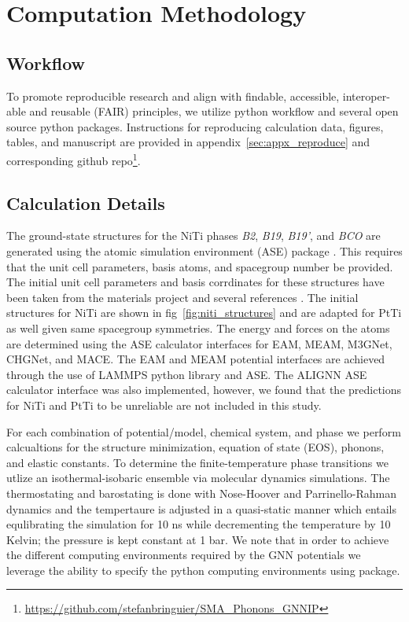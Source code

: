 \documentclass[preprint]{elsarticle}
\begin{document}
\section{Computation Methodology}
\label{sec:methods}

\subsection{Workflow}
\label{sec:workflow}
To promote reproducible research and align with findable, accessible, interoper-able and reusable (FAIR) principles\cite{Walsh2024}, we utilize \showyourwork python workflow\cite{Luger2021} and several open source python packages. Instructions for reproducing calculation data, figures, tables, and manuscript are provided in appendix~\ref{sec:appx_reproduce} and corresponding github repo\footnote{\url{https://github.com/stefanbringuier/SMA_Phonons_GNNIP}}. \par

\subsection{Calculation Details}
\label{sec:calc_details}
The ground-state structures for the NiTi phases \textit{B2}, \textit{B19}, \textit{B19'}, and \textit{BCO} are generated using the atomic simulation environment (ASE) package \cite{Larsen2017}. This requires that the unit cell parameters, basis atoms, and spacegroup number be provided. The initial unit cell parameters and basis corrdinates for these structures have been taken from the materials project \cite{Jain2013} and several references \cite{Haskins2016,Kadkhodaei2018}. The initial structures for NiTi are shown in fig~\ref{fig:niti_structures} and are adapted for PtTi as well given same spacegroup symmetries. The energy and forces on the atoms are determined using the ASE calculator interfaces for EAM, MEAM, M3GNet, CHGNet, and MACE.\cite{Mutter2010,Zhong2011,Ko2015,Kim2017,Chen2022,Deng2023,Batatia2022} The EAM and MEAM potential interfaces are achieved through the use of LAMMPS python library \cite{Thompson2022} and ASE. The ALIGNN ASE calculator interface was also implemented, however, we found that the predictions for NiTi and PtTi to be unreliable are not included in this study.\par

For each combination of potential/model, chemical system, and phase we perform calcualtions for the structure minimization, equation of state (EOS), phonons, and elastic constants. To determine the finite-temperature phase transitions we utlize an isothermal-isobaric ensemble via molecular dynamics simulations. The thermostating and barostating is done with Nose-Hoover and Parrinello-Rahman dynamics and the tempertaure is adjusted in a quasi-static manner which entails equlibrating the simulation for 10 ns while decrementing the temperature by 10 Kelvin; the pressure is kept constant at 1 bar. We note that in order to achieve the different computing environments required by the GNN potentials we leverage the ability to specify the python computing environments using \href{https://github.com/showyourwork/showyourwork}{\showyourwork} package.\par
\end{document}
